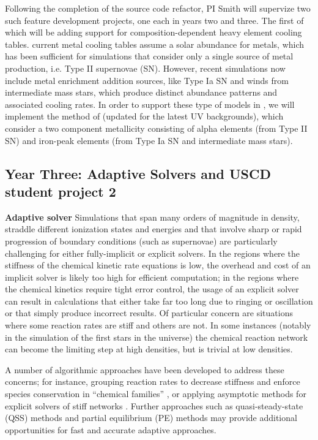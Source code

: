 Following the completion of the source code refactor, PI Smith will
supervize two such feature development projects, one each in years two
and three.  The first of which will be adding support for
composition-dependent heavy element cooling tables.  
current metal cooling tables assume a solar abundance for metals,
which has been sufficient for simulations that consider only a single
source of metal production, i.e. Type II supernovae (SN). However, recent
simulations \citep[e.g.,][]{2014MNRAS.444.1518V, 2015MNRAS.446..521S}
now include metal enrichment addition sources, like Type Ia SN
and winds from intermediate mass stars, which produce distinct abundance
patterns and associated cooling rates.  In order to support these type
of models in \grackle{}, we will implement the method of
\citet{2013MNRAS.433.3005D} (updated for the latest UV backgrounds),
which consider a two component metallicity consisting of alpha
elements (from Type II SN) and iron-peak elements (from Type Ia SN and
intermediate mass stars).

\subsection{Year Three: Adaptive Solvers and USCD student project 2}

\noindent \textbf{Adaptive solver}
Simulations that span many orders of magnitude in density, straddle different
ionization states and energies and that involve sharp or rapid progression of
boundary conditions (such as supernovae) are particularly challenging for
either fully-implicit or explicit solvers.  In the regions where the stiffness
of the chemical kinetic rate equations is low, the overhead and cost of an
implicit solver is likely too high for efficient computation; in the regions
where the chemical kinetics require tight error control, the usage of an
explicit solver can result in calculations that either take far too long due to
ringing or oscillation or that simply produce incorrect results.  Of particular
concern are situations where some reaction rates are stiff and others are not.
In some instances (notably in the simulation of the first stars in the
universe) the chemical reaction network can become the limiting step at high
densities, but is trivial at low densities.

A number of algorithmic approaches have been developed to address these concerns;
for instance, grouping reaction rates to decrease stiffness and enforce species
conservation in ``chemical families''
\citep{doi:10.1002/kin.550100907, SANDU19973151}, or applying 
asymptotic methods for explicit solvers of stiff networks
\citep{1749-4699-6-1-015001}.  Further approaches such as 
quasi-steady-state (QSS) methods \citep{1749-4699-6-1-015002} and 
partial equilibrium (PE) methods \citep{1749-4699-6-1-015003} may provide
additional opportunities for fast and accurate adaptive approaches.

